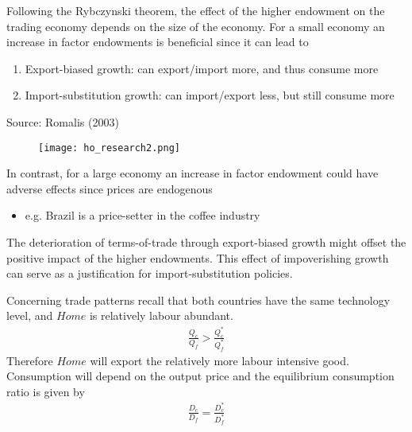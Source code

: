 \documentclass{beamer}
\begin{document}
\begin{frame}
 Following the Rybczynski theorem, the effect of the higher endowment on the trading economy depends on the size of the economy. 
For a small economy an increase in factor endowments is beneficial since it can lead to 
  \begin{enumerate}
    \item Export-biased growth: can export/import more, and thus consume more 
    \item Import-substitution growth: can import/export less, but still consume more 
  \end{enumerate}
\end{frame}

\begin{frame}{Source: Romalis (2003)}
  \begin{figure}
    \texttt{[image: ho\_research2.png]}
  \end{figure}
\end{frame}

\begin{frame}
  In contrast, for a large economy an increase in factor endowment could have adverse effects since prices are endogenous
  \begin{itemize}
    \item e.g. Brazil is a price-setter in the coffee industry
  \end{itemize}
  \medskip
  The deterioration of terms-of-trade through export-biased growth might offset the positive impact of the higher endowments. 
  This effect of impoverishing growth can serve as a justification for import-substitution policies.
\end{frame}

\begin{frame}
  Concerning trade patterns recall that both countries have the same technology level, and $Home$ is relatively labour abundant.
  \begin{align*}
    \frac{Q_c}{Q_f} > \frac{Q_c^*}{Q_f^*}
  \end{align*}
  Therefore $Home$ will export the relatively more labour intensive good.
  Consumption will depend on the output price and the equilibrium consumption ratio is given by
  \begin{align*}
    \frac{D_c}{D_f} = \frac{D_c^*}{D_f^*}
  \end{align*}
\end{frame}
\end{document}
